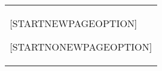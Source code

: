 {\begin{longtable}{T}
[STARTNEWPAGEOPTION]
\n \newpage \n
[ENDNEWPAGEOPTION]

[STARTNONEWPAGEOPTION]
\n \bigskip \n
[ENDNONEWPAGEOPTION]

\hline
\end{longtable}
}
{%
}

